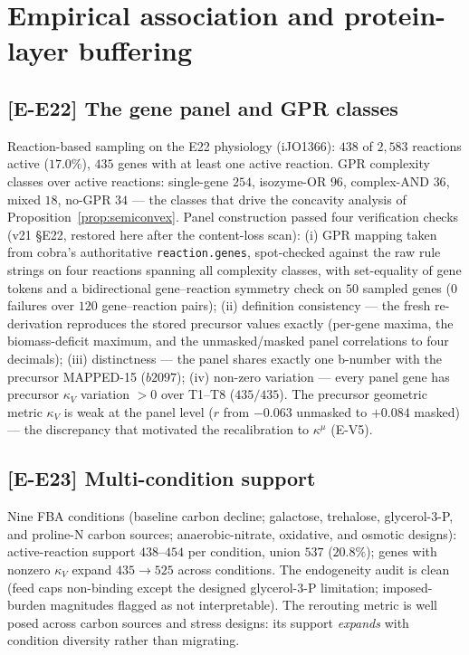 \documentclass[11pt,a4paper]{article}
\theoremstyle{plain}
\theoremstyle{definition}
\theoremstyle{remark}
\newcommand{\kk}{\kappa_{\!V}}
\newcommand{\kmu}{\kappa^{\mu}}
\begin{document}
\section{Empirical association and protein-layer buffering}
\label{sec:empirical}


\subsection{[E-E22] The gene panel and GPR classes}
Reaction-based sampling on the E22 physiology (iJO1366): $438$ of
$2{,}583$ reactions active ($17.0\%$), $435$ genes with at least one
active reaction. GPR complexity classes over active reactions:
single-gene $254$, isozyme-OR $96$, complex-AND $36$, mixed $18$,
no-GPR $34$ --- the classes that drive the concavity analysis of
Proposition~\ref{prop:semiconvex}. Panel construction passed four
verification checks (v21 \S E22, restored here after the content-loss
scan): (i) GPR mapping taken from cobra's authoritative
\texttt{reaction.genes}, spot-checked against the raw rule strings on
four reactions spanning all complexity classes, with set-equality of
gene tokens and a bidirectional gene--reaction symmetry check on $50$
sampled genes ($0$ failures over $120$ gene--reaction pairs); (ii)
definition consistency --- the fresh re-derivation reproduces the
stored precursor values exactly (per-gene maxima, the biomass-deficit
maximum, and the unmasked/masked panel correlations to four
decimals); (iii) distinctness --- the panel shares exactly one
b-number with the precursor MAPPED-15 ($b2097$); (iv) non-zero variation ---
every panel gene has precursor $\kappa_V$ variation $> 0$ over T1--T8
($435/435$). The precursor geometric metric $\kk$ is weak at the panel
level ($r$ from $-0.063$ unmasked to $+0.084$ masked) --- the
discrepancy that motivated the recalibration to $\kmu$ (E-V5).

\subsection{[E-E23] Multi-condition support}
Nine FBA conditions (baseline carbon decline; galactose, trehalose,
glycerol-3-P, and proline-N carbon sources; anaerobic-nitrate,
oxidative, and osmotic designs): active-reaction support $438$--$454$
per condition, union $537$ ($20.8\%$); genes with nonzero $\kk$
expand $435 \to 525$ across conditions. The endogeneity audit is
clean (feed caps non-binding except the designed glycerol-3-P
limitation; imposed-burden magnitudes flagged as not interpretable).
The rerouting metric is well posed across carbon sources and stress
designs: its support \emph{expands} with condition diversity rather
than migrating.
\end{document}
